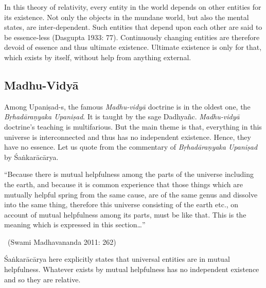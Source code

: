 In this theory of relativity, every entity in the world depends on other entities for its existence. Not only the objects in the mundane world, but also the mental states, are inter-dependent. Such entities that depend upon each other are said to be essence-less (Dasgupta 1933: 77). Continuously changing entities are therefore devoid of essence and thus ultimate existence. Ultimate existence is only for that, which exists by itself, without help from anything external.

\newpage

\subsection*{Madhu-Vidyā}

\vspace{-.3cm}

Among Upaniṣad-s, the famous \textit{Madhu-vidyā} doctrine is in the oldest one, the \textit{Bṛhadāraṇyaka Upaniṣad}. It is taught by the sage Dadhyañc. \textit{Madhu-vidyā} doctrine’s teaching is multifarious. But the main theme is that, everything in this universe is interconnected and thus has no independent existence. Hence, they have no essence. Let us quote from the commentary of \textit{Bṛhadāraṇyaka Upaniṣad} by Śaṅkarācārya.

\begin{myquote}
“Because there is mutual helpfulness among the parts of the universe including the earth, and because it is common experience that those things which are mutually helpful spring from the same cause, are of the same genus and dissolve into the same thing, therefore this universe consisting of the earth etc., on account of mutual helpfulness among its parts, must be like that. This is the meaning which is expressed in this section…” 

~\hfill (Swami Madhavananda 2011: 262)
\end{myquote}

Śaṅkarācārya here explicitly states that universal entities are in mutual helpfulness. Whatever exists by mutual helpfulness has no independent existence and so they are relative.


